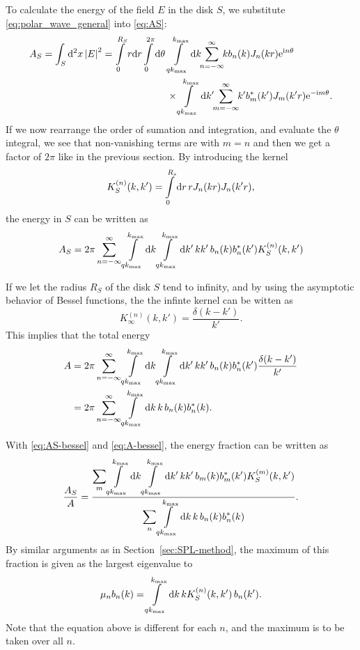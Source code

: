 \documentclass[11pt,a4paper, 
swedish,english %
]{article}
\begin{document}
To calculate the energy of the field $E$ in the disk $S$, we
substitute \eqref{eq:polar_wave_general} into \eqref{eq:AS}: 
\begin{equation}
\begin{aligned}
A_S= \oldint_S \rd^2x\, \abs{E}^2 = 
\int_0^{R_S} r\rd{r} \int_0^{2\pi} \rd\theta \,&
\int_{qk_{\max}}^{k_{\max}} \rd{k}\!\!
\sum_{n= -\infty}^{\infty}\!\! kb_n(k) J_n(kr)\ee^{\ii n \theta}\\
&\times
\int_{qk_{\max}}^{k_{\max}} \rd{k'}\!\!
\sum_{m= -\infty}^{\infty}\!\! k'b_m^*(k') J_m(k'r)\ee^{-\ii m
  \theta}.
\end{aligned}
\end{equation}
If we now rearrange the order of sumation and integration, and
evaluate the $\theta$ integral, we see that non-vanishing terms are
with $m=n$ and then we get a factor of $2\pi$ like in the previous
section. By introducing the kernel 
\begin{equation}\label{eq:KS-bessel}
K_S^{(n)}(k, k') = \int_{0}^{R_s} \rd{r}\, r J_n(kr) J_n(k'r),
\end{equation}
the energy in $S$ can be written as
\begin{equation}\label{eq:AS-bessel}
A_S =2\pi \sum_{n=-\infty}^{\infty} 
\int_{qk_{\max}}^{k_{\max}} \rd{k} \int_{qk_{\max}}^{k_{\max}} \rd{k'}\,  
kk'\, b_n(k)b_n^*(k') K_S^{(n)}(k, k')
\end{equation}

If we let the radius $R_S$ of the disk $S$ tend to infinity, and by
using the asymptotic behavior of Bessel functions, the the infinte
kernel can be witten as
\begin{equation}
K_\infty^{(n)}(k,k') = \frac{\delta(k-k')}{k'}.
\end{equation}
This implies that the total energy
\begin{equation}\label{eq:A-bessel}
\begin{aligned}
A &=2\pi \sum_{n=-\infty}^{\infty} 
\int_{qk_{\max}}^{k_{\max}} \rd{k} \int_{qk_{\max}}^{k_{\max}} \rd{k'}\,  
kk'\, b_n(k)b_n^*(k') \frac{\delta(k-k')}{k'} \\
&=2\pi \sum_{n=-\infty}^{\infty} 
\int_{qk_{\max}}^{k_{\max}} \rd{k} \, k\, b_n(k)b_n^*(k).
\end{aligned}
\end{equation}

With \eqref{eq:AS-bessel} and \eqref{eq:A-bessel}, the energy fraction
can be written as
\begin{equation}\label{eq:E-frac-bessel}
\frac{A_S}{A}
=\frac{\displaystyle{\sum_{m}} \int_{qk_{\max}}^{k_{\max}} \rd{k} \int_{qk_{\max}}^{k_{\max}} \rd{k'}\,  
kk'\, b_m(k)b_m^*(k') K_S^{(m)}(k, k')}
{\displaystyle{\sum_{n}} \int_{qk_{\max}}^{k_{\max}} \rd{k} \, k\, b_n(k)b_n^*(k)}.
\end{equation}
By similar arguments as in Section~\ref{sec:SPL-method}, the maximum
of this fraction is given as the largest eigenvalue to
\begin{equation}
\mu_nb_n(k) = \int_{qk_{\max}}^{{k_{\max}}}\rd{k}\,k K_S^{(n)}(k, k')\,b_n(k').
\end{equation}
Note that the equation above is different for each $n$, and the
maximum is to be taken over all $n$.
\end{document}
